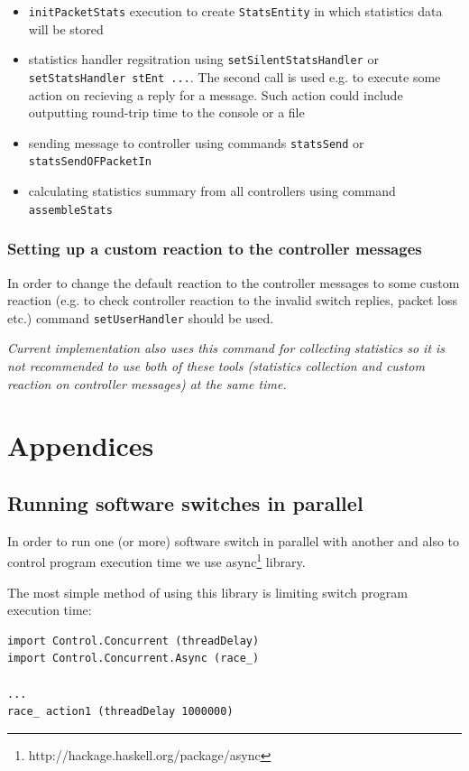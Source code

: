 \documentclass[9pt,a4paper]{article}
\begin{document}
\begin{itemize}
  \item \lstinline!initPacketStats! execution to create
    \lstinline!StatsEntity! in which statistics data will be stored
  \item statistics handler regsitration using
    \lstinline!setSilentStatsHandler!  or \lstinline!setStatsHandler stEnt ...!.
    The second call is used e.g. to execute some action on recieving a reply
    for a message. Such action could include
    outputting round-trip time to the console or a file
  \item sending message to controller using commands
    \lstinline!statsSend! or \lstinline!statsSendOFPacketIn!
  \item calculating statistics summary from all controllers using
    command \lstinline!assembleStats!
\end{itemize}

\subsubsection{Setting up a custom reaction to the controller messages}

In order to change the default reaction to the controller messages to
some custom reaction (e.g. to check controller reaction to the invalid
switch replies, packet loss etc.) command \lstinline!setUserHandler!
should be used.

\emph{Current implementation also uses this command for collecting
  statistics so it is not recommended to use both of these tools
  (statistics collection and custom reaction on controller messages)
  at the same time.}

\section{Appendices}

\subsection{Running software switches in parallel}

In order to run one (or more) software switch in parallel with another
and also to control program execution time we use
async\footnote{http://hackage.haskell.org/package/async} library.

The most simple method of using this library is limiting switch
program execution time:

\begin{lstlisting}
import Control.Concurrent (threadDelay)
import Control.Concurrent.Async (race_)

...
race_ action1 (threadDelay 1000000)
\end{lstlisting}
\end{document}
